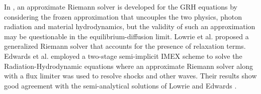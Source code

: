 \documentclass[times,doublespace]{fldauth}%
\begin{document}
In \cite{Balsara}, an approximate Riemann solver is developed for the GRH equations by considering the frozen approximation that uncouples the two physics, photon radiation and material hydrodynamics, but the validity of such an approximation may be questionable in the equilibrium-diffusion limit.
Lowrie et al. \cite{LowrieMorelHittinger} proposed a generalized Riemann solver that accounts for the presence of relaxation terms.
Edwards et al. \cite{EdwardsMorelLowrie} employed a two-stage semi-implicit IMEX scheme to solve the Radiation-Hydrodynamic equations where an approximate Riemann solver along with a flux limiter was used to resolve shocks and other waves. 
Their results show good agreement with the semi-analytical solutions of Lowrie and Edwards \cite{LowrieEdwards}.
%
%
\end{document}
